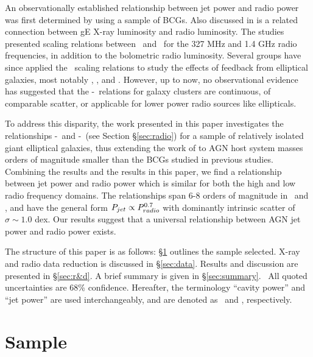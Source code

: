 \documentclass{emulateapj}
\begin{document}
An observationally established relationship between jet power and
radio power was first determined by \citet{birzan04, birzan08} using a
sample of BCGs. Also discussed in \citet{2008ApJ...680..897D} is a
related connection between gE X-ray luminosity and radio
luminosity. The \citet{birzan04, birzan08} studies presented scaling
relations between \pjet\ and \prad\ for the 327 MHz and 1.4 GHz radio
frequencies, in addition to the bolometric radio luminosity. Several
groups have since applied the \birzan\ scaling relations to study the
effects of feedback from elliptical galaxies, most notably
\citet{best07}, \citet{2007MNRAS.379..260M}, and
\citet{2009arXiv0908.3158H}. However, up to now, no observational
evidence has suggested that the \pjet-\prad\ relations for galaxy
clusters are continuous, of comparable scatter, or applicable for
lower power radio sources like ellipticals.

To address this disparity, the work presented in this paper
investigates the relationships \pjet-\phigh\ and \pjet-\plow\ (see
Section \S\ref{sec:radio}) for a sample of relatively isolated giant
elliptical galaxies, thus extending the work of \citet{birzan08} to
AGN host system masses orders of magnitude smaller than the BCGs
studied in previous studies. Combining the \citet{birzan08} results
and the results in this paper, we find a relationship between jet
power and radio power which is similar for both the high and low radio
frequency domains. The relationships span 6-8 orders of magnitude in
\pjet\ and \prad, and have the general form $P_{jet} \propto
P_{radio}^{0.7}$ with dominantly intrinsic scatter of $\sigma \sim 1.0$
dex. Our results suggest that a universal relationship between AGN jet
power and radio power exists.

The structure of this paper is as follows: \S\ref{sec:sample} outlines
the sample selected. X-ray and radio data reduction is discussed in
\S\ref{sec:data}. Results and discussion are presented in
\S\ref{sec:r&d}. A brief summary is given in
\S\ref{sec:summary}. \LCDM\ All quoted uncertainties are 68\%
confidence. Hereafter, the terminology ``cavity power'' and ``jet
power'' are used interchangeably, and are denoted as \pcav\ and \pjet,
respectively.

\section{Sample}
\label{sec:sample}

\end{document}
